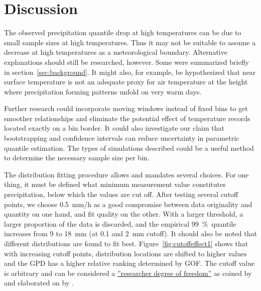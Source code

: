 \documentclass[a4paper]{article}
\newcommand{\todo}[1]{\emph{\textcolor{red}{#1}}}
\begin{document}



\pagebreak
\section{Discussion} %
\label{sec:discussion}

\begin{multicols}{2}
The observed precipitation quantile drop at high temperatures can be due to small sample sizes at high temperatures.
Thus it may not be suitable to assume a decrease at high temperatures as a meteorological boundary.
Alternative explanations should still be researched, however.
Some were summarized briefly in section~\ref{sec:background}.
It might also, for example, be hypothesized that near surface temperature is not an adequate proxy for air temperature at the height where precipitation forming patterns unfold on very warm days.

Further research could incorporate moving windows instead of fixed bins to get smoother relationships and eliminate the potential effect of temperature records located exactly on a bin border.
It could also investigate our claim that bootstrapping and confidence intervals can reduce uncertainty in parametric quantile estimation.
The types of simulations described could be a useful method to determine the necessary sample size per bin.

The distribution fitting procedure allows and mandates several choices. 
For one thing, it must be defined what minimum measurement value constitutes precipitation, below which the   values are cut off.
After testing several cutoff points, we choose 0.5~mm/h as a good compromise between data originality and quantity on one hand, and fit quality on the other.
With a larger threshold, a larger proportion of the data is discarded, and the empirical 99~\%~quantile increases from 9 to 18~mm (at 0.1 and 2~mm cutoff).
It should also be noted that different distributions are found to fit best.
Figure~\ref{fig:cutoffeffect1} shows that with increasing cutoff points, distribution locations are shifted to higher values and the GPD has a higher relative ranking determined by GOF.
The cutoff value is arbitrary and can be considered a \href{http://andrewgelman.com/2012/11/01/researcher-degrees-of-freedom}{''researcher degree of freedom''} as coined by \citet{simmons_false-positive_2011} and elaborated on by \citet{gelman_garden_2013}. 


\end{multicols}
\end{document}

